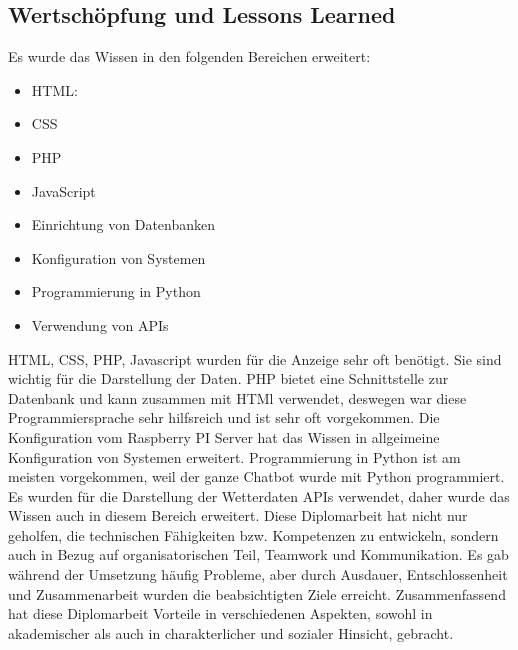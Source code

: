 \subsection{Wertschöpfung und Lessons Learned}
Es wurde das Wissen in den folgenden Bereichen erweitert: \\
\begin{itemize}
	\item HTML: 
\end{itemize}
\begin{itemize}
	\item CSS
\end{itemize}
\begin{itemize}
	\item PHP
\end{itemize}
\begin{itemize}
	\item JavaScript
\end{itemize}
\begin{itemize}
	\item Einrichtung von Datenbanken
\end{itemize}
\begin{itemize}
	\item Konfiguration von Systemen
\end{itemize} 
\begin{itemize}
	\item Programmierung in Python
\end{itemize}
 \begin{itemize}
 	\item Verwendung von APIs
 \end{itemize}
HTML, CSS, PHP, Javascript wurden f\"ur die Anzeige sehr oft ben\"otigt. Sie sind wichtig f\"ur die Darstellung der Daten. PHP bietet eine Schnittstelle zur Datenbank und kann zusammen mit HTMl verwendet, deswegen war diese Programmiersprache sehr hilfsreich und ist sehr oft vorgekommen. Die Konfiguration vom Raspberry PI Server hat das Wissen in allgeimeine Konfiguration von Systemen erweitert. Programmierung in Python ist am meisten vorgekommen, weil der ganze Chatbot wurde mit Python programmiert. Es wurden f\"ur die Darstellung der Wetterdaten APIs verwendet, daher wurde das Wissen auch in diesem Bereich erweitert. 
Diese Diplomarbeit hat nicht nur geholfen, die technischen Fähigkeiten bzw. Kompetenzen zu entwickeln, sondern auch in Bezug auf organisatorischen Teil, Teamwork und Kommunikation. Es gab w\"ahrend der Umsetzung h\"aufig Probleme, aber durch Ausdauer, Entschlossenheit und Zusammenarbeit wurden die beabsichtigten Ziele erreicht. 
Zusammenfassend hat diese Diplomarbeit Vorteile in verschiedenen Aspekten, sowohl in akademischer als auch in charakterlicher und sozialer Hinsicht, gebracht.
\label{\docname}

